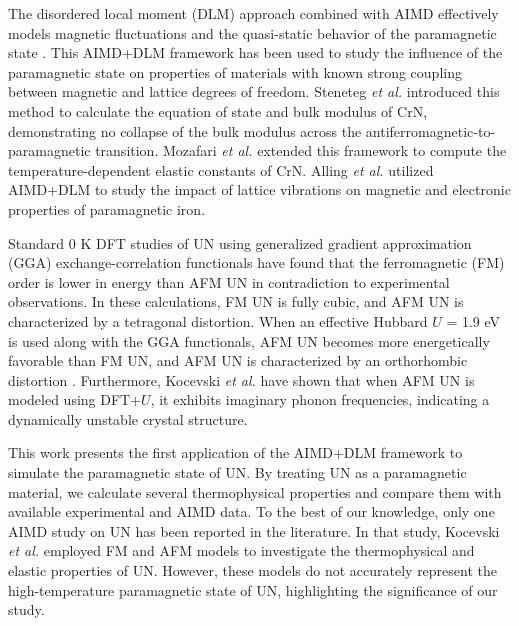 \documentclass[preprint, 12pt]{elsarticle}
\newcommand{\?}{\stackrel{?}{=}}
\begin{document}
The disordered local moment (DLM) approach combined with AIMD effectively models magnetic fluctuations and the quasi-static behavior of the paramagnetic state \cite{Abrikosov2016}. This AIMD+DLM framework has been used to study the influence of the paramagnetic state on properties of materials with known strong coupling between magnetic and lattice degrees of freedom. Steneteg \textit{et al.} \cite{Steneteg2012} introduced this method to calculate the equation of state and bulk modulus of CrN, demonstrating no collapse of the bulk modulus across the antiferromagnetic-to-paramagnetic transition. Mozafari \textit{et al.} \cite{Mozafari2016} extended this framework to compute the temperature-dependent elastic constants of CrN. Alling \textit{et al.} \cite{Alling2016} utilized AIMD+DLM to study the impact of lattice vibrations on magnetic and electronic properties of paramagnetic iron.


Standard 0 K DFT studies of UN using generalized gradient approximation (GGA) exchange-correlation functionals have found that the ferromagnetic (FM) order is lower in energy than AFM UN \cite{Kocevski2022I} in contradiction to experimental observations. In these calculations, FM UN is fully cubic, and AFM UN is characterized by a tetragonal distortion. When an effective Hubbard $U$ = 1.9 eV is used along with the GGA functionals, AFM UN becomes more energetically favorable than FM UN, and AFM UN is characterized by an orthorhombic distortion \cite{Claisse2016b}. Furthermore, Kocevski \textit{et al.} \cite{Kocevski2022I} have shown that when AFM UN is modeled using DFT+$U$, it exhibits imaginary phonon frequencies, indicating a dynamically unstable crystal structure.

This work presents the first application of the AIMD+DLM framework to simulate the paramagnetic state of UN. By treating UN as a paramagnetic material, we calculate several thermophysical properties and compare them with available experimental and AIMD data. To the best of our knowledge, only one AIMD study on UN has been reported in the literature. In that study, Kocevski \textit{et al.} \cite{Kocevski2023} employed FM and AFM models to investigate the thermophysical and elastic properties of UN. However, these models do not accurately represent the high-temperature paramagnetic state of UN, highlighting the significance of our study.



\end{document}
